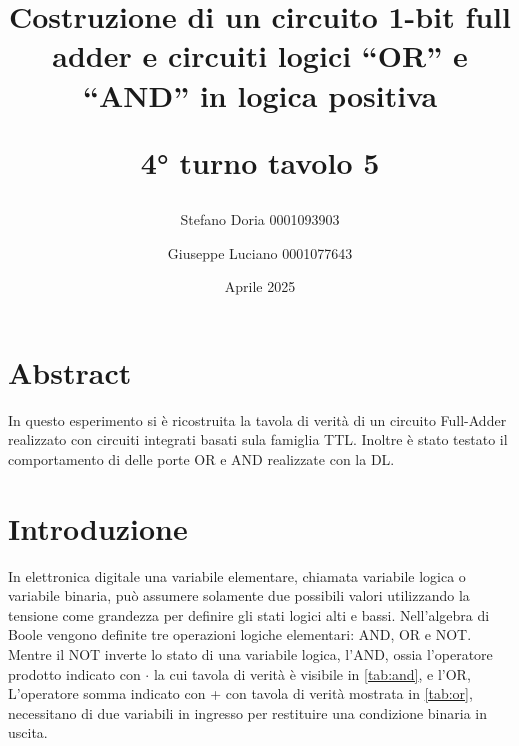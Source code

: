 \documentclass[a4paper,11pt]{article}
\begin{document}
	\title{\textbf{Costruzione di un circuito 1-bit full adder e circuiti logici “OR” e “AND” in logica positiva}
		
		4° turno tavolo 5}
	\author{Stefano Doria 0001093903 \and Giuseppe Luciano 0001077643}
	
	\date{Aprile 2025}
	
	\maketitle
	
	\section{Abstract}
	In questo esperimento si è ricostruita la tavola di verità di un circuito Full-Adder realizzato con circuiti integrati basati sula famiglia TTL. Inoltre è stato testato il comportamento di delle porte OR e AND realizzate con la DL.
	
	\section{Introduzione}
	In elettronica digitale una variabile elementare, chiamata variabile logica o variabile binaria, può assumere solamente due possibili valori utilizzando la tensione come grandezza per definire gli stati logici alti e bassi. Nell'algebra di Boole vengono definite tre operazioni logiche elementari: AND, OR e NOT. Mentre il NOT inverte lo stato di una variabile logica, l'AND, ossia l'operatore prodotto indicato con $\cdot$ la cui tavola di verità è visibile in \ref{tab:and}, e l'OR, L'operatore somma indicato con + con tavola di verità mostrata in \ref{tab:or}, necessitano di due variabili in ingresso per restituire una condizione binaria in uscita.
	
\end{document}
